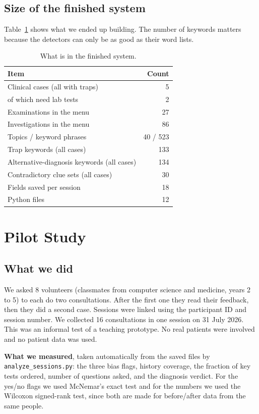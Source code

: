 \documentclass[conference]{IEEEtran}
\begin{document}
\subsection{Size of the finished system}
Table~\ref{tab:system} shows what we ended up building. The number of keywords
matters because the detectors can only be as good as their word lists.

\begin{table}[t]
\caption{What is in the finished system.}
\label{tab:system}
\centering
\small
\begin{tabular}{@{}lr@{}}
\toprule
\textbf{Item} & \textbf{Count} \\
\midrule
Clinical cases (all with traps) & 5 \\
\quad of which need lab tests & 2 \\
Examinations in the menu & 27 \\
Investigations in the menu & 86 \\
Topics / keyword phrases & 40 / 523 \\
Trap keywords (all cases) & 133 \\
Alternative-diagnosis keywords (all cases) & 134 \\
Contradictory clue sets (all cases) & 30 \\
Fields saved per session & 18 \\
Python files & 12 \\
\bottomrule
\end{tabular}
\end{table}

\section{Pilot Study}
\label{sec:pilot}
\subsection{What we did}
We asked 8 volunteers (classmates from computer science and medicine, years 2 to
5) to each do two consultations. After the first one they read their feedback,
then they did a second case. Sessions were linked using the participant ID and
session number. We collected 16 consultations in one session on 31 July 2026.
This was an informal test of a teaching prototype. No real patients were
involved and no patient data was used.

\textbf{What we measured}, taken automatically from the saved files by
\texttt{analyze\_sessions.py}: the three bias flags, history coverage, the
fraction of key tests ordered, number of questions asked, and the diagnosis
verdict. For the yes/no flags we used McNemar's exact test and for the numbers we
used the Wilcoxon signed-rank test, since both are made for before/after data
from the same people.
\end{document}
